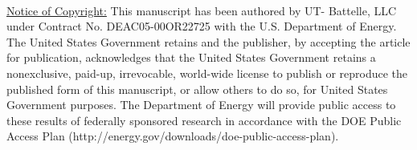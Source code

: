 \documentclass[10pt,conference,final]{IEEEtran}
\begin{document}
\hfill \\
\underline{Notice of Copyright:} This manuscript has been authored by UT-
Battelle, LLC under Contract No. DEAC05-00OR22725 with the U.S. Department of
Energy. The United States Government retains and the publisher, by accepting
the article for publication, acknowledges that the United States Government
retains a nonexclusive, paid-up, irrevocable, world-wide license to publish or
reproduce the published form of this manuscript, or allow others to do so, for
United States Government purposes. The Department of Energy will provide
public access to these results of federally sponsored research in accordance
with the DOE Public Access Plan (http://energy.gov/downloads/doe-public-access-plan).













\end{document}
